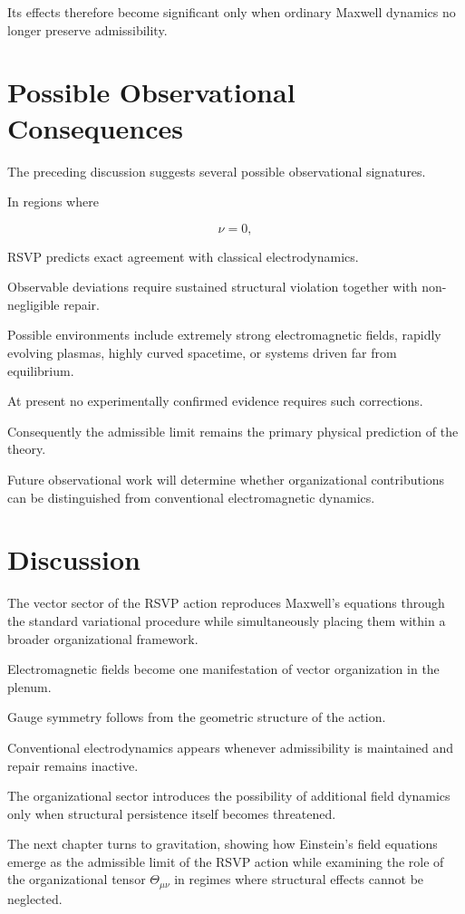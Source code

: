 \documentclass[11pt,oneside]{book}
\numberwithin{equation}{chapter}
\theoremstyle{definition}
\theoremstyle{plain}
\begin{document}
Its effects therefore become significant only when ordinary Maxwell dynamics
no longer preserve admissibility.

\section{Possible Observational Consequences}

The preceding discussion suggests several possible observational
signatures.

In regions where

\[
\nu=0,
\]

RSVP predicts exact agreement with classical electrodynamics.

Observable deviations require sustained structural violation together with
non-negligible repair.

Possible environments include extremely strong electromagnetic fields,
rapidly evolving plasmas, highly curved spacetime, or systems driven far
from equilibrium.

At present no experimentally confirmed evidence requires such corrections.

Consequently the admissible limit remains the primary physical prediction of
the theory.

Future observational work will determine whether organizational
contributions can be distinguished from conventional electromagnetic
dynamics.

\section{Discussion}

The vector sector of the RSVP action reproduces Maxwell's equations through
the standard variational procedure while simultaneously placing them within
a broader organizational framework.

Electromagnetic fields become one manifestation of vector organization in
the plenum.

Gauge symmetry follows from the geometric structure of the action.

Conventional electrodynamics appears whenever admissibility is maintained
and repair remains inactive.

The organizational sector introduces the possibility of additional field
dynamics only when structural persistence itself becomes threatened.

The next chapter turns to gravitation, showing how Einstein's field
equations emerge as the admissible limit of the RSVP action while examining
the role of the organizational tensor \(\Theta_{\mu\nu}\) in regimes where
structural effects cannot be neglected.
\end{document}
